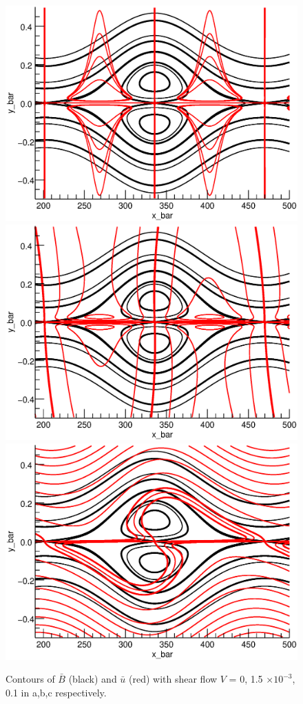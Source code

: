 	
	\begin{figure}[htbp]
	\caption{Contours of $\bar{B}$ (black) and $\bar{u}$ (red) with shear flow $V$ = 0, 1.5 $\times 10^{-3}$, 0.1 in a,b,c respectively.}
		\label{fig:contour}
			\includegraphics{ParkerLongcope2017/contour_noshear.eps}
	        \includegraphics{ParkerLongcope2017/contour_midshear.eps}
	        \includegraphics{ParkerLongcope2017/contour_highshear.eps}
        		
			
	\end{figure}
	
